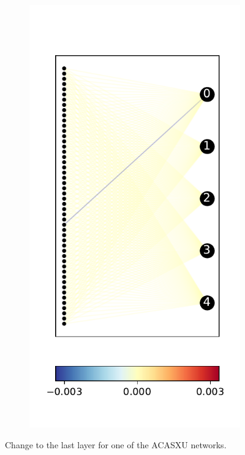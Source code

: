 \documentclass{easychair}
\begin{document}
\begin{figure}
\begin{subfigure}{0.2\linewidth}
  \includegraphics[width=\linewidth]{./images/ACASXU_2_9_3_vals.pdf}
\end{subfigure}
\caption{Change to the last layer for one of the ACASXU networks.}
\label{fig:lastLayerACASXU}
\end{figure}
\end{document}
